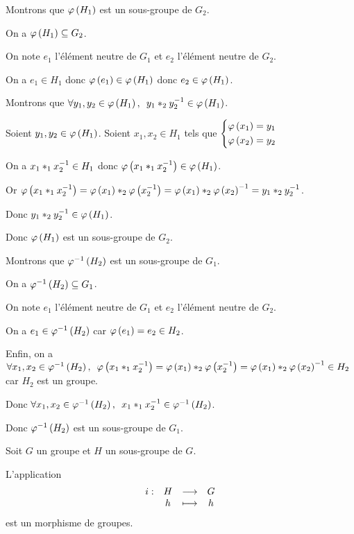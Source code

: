 \begin{dem}[1]
Montrons que \(\varphi\left(H_1\right)\) est un sous-groupe de \(G_2\).

On a \(\varphi\left(H_1\right)\subseteq G_2\).

On note \(e_1\) l'élément neutre de \(G_1\) et \(e_2\) l'élément neutre de \(G_2\).

On a \(e_1\in H_1\) donc \(\varphi\left(e_1\right)\in\varphi\left(H_1\right)\) donc \(e_2\in\varphi\left(H_1\right)\).

Montrons que \(\quantifs{\forall y_1,y_2\in\phi\paren{H_1}}y_1*_2y_2\inv\in\phi\paren{H_1}\).

Soient \(y_1,y_2\in\varphi\left(H_1\right)\). Soient \(x_1,x_2\in H_1\) tels que \(\begin{dcases}\varphi\left(x_1\right)=y_1 \\ \varphi\left(x_2\right)=y_2\end{dcases}\)

On a \(x_1*_1x_2^{-1}\in H_1\) donc \(\varphi\left(x_1*_1x_2^{-1}\right)\in\varphi\left(H_1\right)\).

Or \(\varphi\left(x_1*_1x_2^{-1}\right)=\varphi\left(x_1\right)*_2\varphi\left(x_2^{-1}\right)=\varphi\left(x_1\right)*_2\varphi\left(x_2\right)^{-1}=y_1*_2y_2^{-1}\).

Donc \(y_1*_2y_2^{-1}\in\varphi\left(H_1\right)\).

Donc \(\varphi\left(H_1\right)\) est un sous-groupe de \(G_2\).
\end{dem}

\begin{dem}[2]
Montrons que \(\varphi^{-1}\left(H_2\right)\) est un sous-groupe de \(G_1\).

On a \(\varphi^{-1}\left(H_2\right)\subseteq G_1\).

On note \(e_1\) l'élément neutre de \(G_1\) et \(e_2\) l'élément neutre de \(G_2\).

On a \(e_1\in\varphi^{-1}\left(H_2\right)\) car \(\varphi\left(e_1\right)=e_2\in H_2\).

Enfin, on a \(\quantifs{\forall x_1,x_2\in\phi\inv\paren{H_2}}\phi\paren{x_1*_1x_2\inv}=\phi\paren{x_1}*_2\phi\paren{x_2\inv}=\phi\paren{x_1}*_2\phi\paren{x_2}\inv\in H_2\) car \(H_2\) est un groupe.

Donc \(\quantifs{\forall x_1,x_2\in\phi\inv\paren{H_2}}x_1*_1x_2\inv\in\phi\inv\paren{H_2}\).

Donc \(\varphi^{-1}\left(H_2\right)\) est un sous-groupe de \(G_1\).
\end{dem}

\begin{prop}
Soit \(G\) un groupe et \(H\) un sous-groupe de \(G\).

L'application \[\begin{array}[t]{cccc}i : & H & \longrightarrow & G \\ & h & \longmapsto & h\end{array}\] est un morphisme de groupes.
\end{prop}

